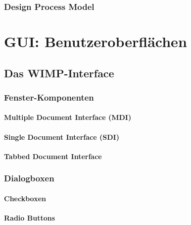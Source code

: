\documentclass[a4paper, 11pt, accentcolor = tud3b]{tudreport}
\begin{document}
				\subsubsection{Design Process Model} %

		\section{GUI: Benutzeroberflächen} %

			\subsection{Das WIMP-Interface} %

				\subsubsection{Fenster-Komponenten} %

					\paragraph{Multiple Document Interface (MDI)} %

					\paragraph{Single Document Interface (SDI)} %

					\paragraph{Tabbed Document Interface} %

				\subsubsection{Dialogboxen} %

					\paragraph{Checkboxen} %

					\paragraph{Radio Buttons} %
\end{document}

